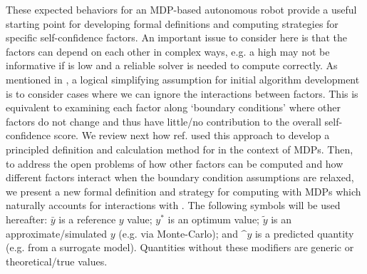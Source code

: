 These expected behaviors for an MDP-based autonomous robot provide a useful starting point for developing formal definitions and computing strategies for specific self-confidence factors. 
An important issue to consider here is that the factors can depend on each other in complex ways, e.g. a high \xO{} may not be informative if \xQ{} is low and a reliable solver is needed to compute \xO{} correctly. %
As mentioned in \cite{Aitken2016-cv}, a logical simplifying assumption for initial algorithm development is to consider cases where we can ignore the interactions between factors. 
This is equivalent to examining each factor along `boundary conditions' where other factors do not change and thus have little/no contribution to the overall self-confidence score. 
We review next how ref. \cite{Aitken2016-cv} used this approach to develop a principled definition and calculation method for \xO{} in the context of MDPs. Then, to address the open problems of how other factors can be computed and how different factors interact when the boundary condition assumptions are relaxed, we present a new formal definition and strategy for computing \xQ{} with MDPs which naturally accounts for interactions with \xO{}. %
The following symbols will be used hereafter: $\bar{y}$ is a reference $y$ value; $y^*$ is an optimum value; $\tilde{y}$ is an approximate/simulated $y$ (e.g. via Monte-Carlo); and $\^{y}$ is a predicted quantity (e.g. from a surrogate model). Quantities without these modifiers are generic or theoretical/true values. 